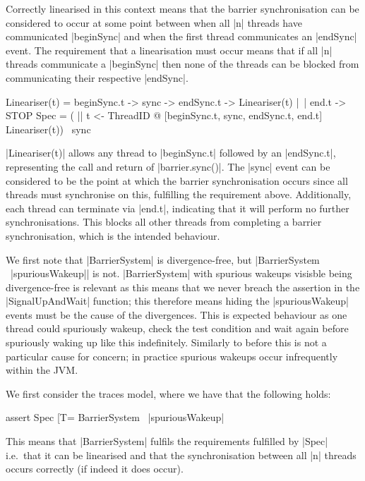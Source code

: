 Correctly linearised in this context means that the barrier synchronisation can be considered to occur at some point between when all |n| threads have communicated |beginSync| and when the first thread communicates an |endSync| event. The requirement that a linearisation must occur means that if all |n| threads communicate a |beginSync| then none of the threads can be blocked from communicating their respective |endSync|.

\begin{cspm}[caption={The lineariser specification for barrier synchronisations}]
Lineariser(t) = beginSync.t -> sync -> endSync.t -> Lineariser(t)
              |~| end.t -> STOP
Spec = ( || t <- ThreadID @ [{beginSync.t, sync, endSync.t, end.t}] 
              Lineariser(t)) \ {sync}
\end{cspm}

|Lineariser(t)| allows any thread to |beginSync.t| followed by an |endSync.t|, representing the call and return of |barrier.sync()|. The |sync| event can be considered to be the point at which the barrier synchronisation occurs since all threads must synchronise on this, fulfilling the requirement above. Additionally, each thread can terminate via |end.t|, indicating that it will perform no further synchronisations. This blocks all other threads from completing a barrier synchronisation, which is the intended behaviour.

We first note that |BarrierSystem| is divergence-free, but |BarrierSystem \ {|spuriousWakeup|}| is not. |BarrierSystem| with spurious wakeups visisble being divergence-free is relevant as this means that we never breach the assertion in the |SignalUpAndWait| function; this therefore means hiding the |spuriousWakeup| events must be the cause of the divergences. This is expected behaviour as one thread could spuriously wakeup, check the test condition and wait again before spuriously waking up like this indefinitely. Similarly to before this is not a particular cause for concern; in practice spurious wakeups occur infrequently within the JVM.

We first consider the traces model, where we have that the following holds:
\begin{cspm}
assert Spec [T= BarrierSystem \ {|spuriousWakeup|}
\end{cspm}
This means that |BarrierSystem| fulfils the requirements fulfilled by |Spec| i.e.~that it can be linearised and that the synchronisation between all |n| threads occurs correctly (if indeed it does occur).

